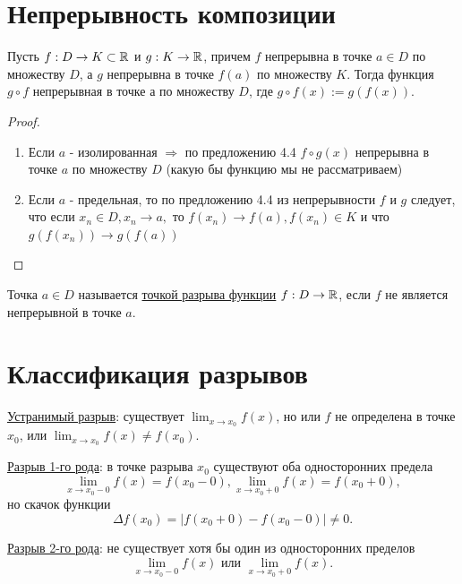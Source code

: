 	\section{Непрерывность композиции}
	
	\begin{sentence}
		Пусть $f : D \rightarrow K \subset \mathbb R$ и $g : K \rightarrow \mathbb R$, причем $f$ непрерывна в точке $a \in D$ по множеству $D$, а $g$ непрерывна в точке $f(a)$ по
		множеству $K$. Тогда функция $g \circ f$ непрерывная в точке $а$ по множеству $D$, где $g \circ f(x) := g(f(x))$.
	\end{sentence}
	
	\begin{proof}
		\begin{enumerate}
			\item Если $a$ - изолированная $\Rightarrow$ по предложению 4.4 $f \circ g(x)$ непрерывна в точке $a$ по множеству $D$ (какую бы функцию мы не рассматриваем)
			\item Если $a$ - предельная, то по предложению 4.4 из непрерывности $f$ и $g$ следует, что если $x_n \in D, x_n \to a,$ то $f(x_n) \to f(a), f(x_n) \in K$ и что $g(f(x_n)) \to g(f(a))$
		\end{enumerate}
	\end{proof}
	
	\begin{definition}
		Точка $a \in D$ называется \underline{точкой разрыва функции} $f : D \rightarrow \mathbb R$, если $f$ не является непрерывной в точке $a$.
	\end{definition}
	
	\section{Классификация разрывов}
	
	\begin{definition}
		\underline{Устранимый разрыв}: существует $\lim_{x \to x_0} f(x)$, но или $f$ не определена в точке $x_0$, или $\lim_{x \to x_0} f(x) \neq f(x_0)$.
		
		\underline{Разрыв 1-го рода}: в точке разрыва $x_0$ существуют оба односторонних предела
		\[ \lim_{x \to x_0 - 0} f(x) = f(x_0 - 0), \lim_{x \to x_0 + 0} f(x) = f(x_0 + 0), \]		
		но скачок функции
		\[ \Delta f(x_0) = |f(x_0 + 0) - f(x_0 - 0)| \neq 0. \]
		
		\underline{Разрыв 2-го рода}: не существует хотя бы один из односторонних пределов
		\[ \lim_{x \to x_0 - 0} f(x) \text{ или } \lim_{x \to x_0 + 0} f(x). \]
	\end{definition}
	

